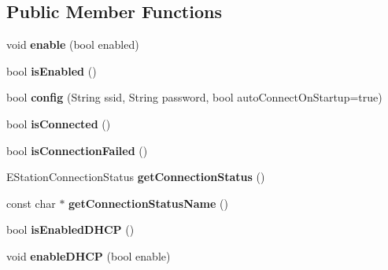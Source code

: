 \subsection*{Public Member Functions}
\begin{DoxyCompactItemize}
\item 
\hypertarget{class_station_class_a2d75f4b103a7b3716472d25cfb96721b}{}void {\bfseries enable} (bool enabled)\label{class_station_class_a2d75f4b103a7b3716472d25cfb96721b}

\item 
\hypertarget{class_station_class_a254b4e9bbd12fa349a0dc872f9129b87}{}bool {\bfseries is\+Enabled} ()\label{class_station_class_a254b4e9bbd12fa349a0dc872f9129b87}

\item 
\hypertarget{class_station_class_ab8f2acf6c2dbd5edd0fb227c62feb033}{}bool {\bfseries config} (String ssid, String password, bool auto\+Connect\+On\+Startup=true)\label{class_station_class_ab8f2acf6c2dbd5edd0fb227c62feb033}

\item 
\hypertarget{class_station_class_a9c0028f4b36957c6964adbfc95a4d5e3}{}bool {\bfseries is\+Connected} ()\label{class_station_class_a9c0028f4b36957c6964adbfc95a4d5e3}

\item 
\hypertarget{class_station_class_a68a06f1464ee0c3b7365e6914d269cca}{}bool {\bfseries is\+Connection\+Failed} ()\label{class_station_class_a68a06f1464ee0c3b7365e6914d269cca}

\item 
\hypertarget{class_station_class_abe754978b682adcae119b4ea0f762f8b}{}E\+Station\+Connection\+Status {\bfseries get\+Connection\+Status} ()\label{class_station_class_abe754978b682adcae119b4ea0f762f8b}

\item 
\hypertarget{class_station_class_a4a8fdbba05fa3343577471f6070adac3}{}const char $\ast$ {\bfseries get\+Connection\+Status\+Name} ()\label{class_station_class_a4a8fdbba05fa3343577471f6070adac3}

\item 
\hypertarget{class_station_class_affe9ad2f57b898551ede57c571c164df}{}bool {\bfseries is\+Enabled\+D\+H\+C\+P} ()\label{class_station_class_affe9ad2f57b898551ede57c571c164df}

\item 
\hypertarget{class_station_class_a828cf12352dce3e6dbddf656f2c55ca3}{}void {\bfseries enable\+D\+H\+C\+P} (bool enable)\label{class_station_class_a828cf12352dce3e6dbddf656f2c55ca3}


\end{DoxyCompactItemize}
